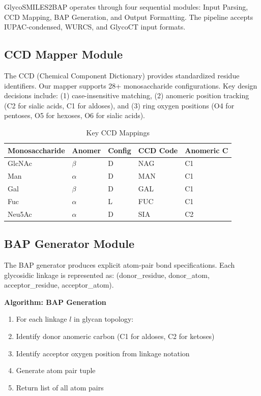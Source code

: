 GlycoSMILES2BAP operates through four sequential modules: Input Parsing, CCD Mapping, BAP Generation, and Output Formatting. The pipeline accepts IUPAC-condensed, WURCS, and GlycoCT input formats.

\subsection{CCD Mapper Module}

The CCD (Chemical Component Dictionary) provides standardized residue identifiers. Our mapper supports 28+ monosaccharide configurations. Key design decisions include: (1) case-insensitive matching, (2) anomeric position tracking (C2 for sialic acids, C1 for aldoses), and (3) ring oxygen positions (O4 for pentoses, O5 for hexoses, O6 for sialic acids).

\begin{table}[h]
\centering
\caption{Key CCD Mappings}
\begin{tabular}{lllll}
\toprule
Monosaccharide & Anomer & Config & CCD Code & Anomeric C \\
\midrule
GlcNAc & $\beta$ & D & NAG & C1 \\
Man & $\alpha$ & D & MAN & C1 \\
Gal & $\beta$ & D & GAL & C1 \\
Fuc & $\alpha$ & L & FUC & C1 \\
Neu5Ac & $\alpha$ & D & SIA & C2 \\
\bottomrule
\end{tabular}
\label{tab:ccd}
\end{table}

\subsection{BAP Generator Module}

The BAP generator produces explicit atom-pair bond specifications. Each glycosidic linkage is represented as: (donor\_residue, donor\_atom, acceptor\_residue, acceptor\_atom).

\noindent\textbf{Algorithm: BAP Generation}
\begin{enumerate}
\item For each linkage $l$ in glycan topology:
\item \quad Identify donor anomeric carbon (C1 for aldoses, C2 for ketoses)
\item \quad Identify acceptor oxygen position from linkage notation
\item \quad Generate atom pair tuple
\item Return list of all atom pairs
\end{enumerate}

